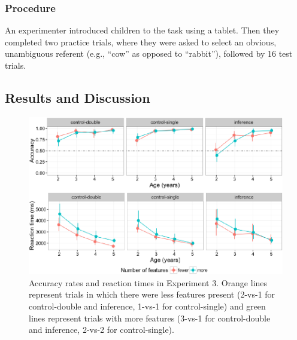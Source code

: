 \documentclass[a4paper,man,apacite,floatsintext]{apa6}
\newenvironment{CodeChunk}{}{}
\begin{document}
\subsubsection{Procedure}\label{procedure-1}

An experimenter introduced children to the task using a tablet. Then
they completed two practice trials, where they were asked to select an
obvious, unambiguous referent (e.g., ``cow'' as opposed to ``rabbit''),
followed by 16 test trials.

\subsection{Results and Discussion}\label{results-and-discussion-2}

\begin{CodeChunk}
\begin{figure}[H]

{\centering \includegraphics{figs/ipaccrt-1} 

}

\caption[Accuracy rates and reaction times in Experiment 3]{Accuracy rates and reaction times in Experiment 3. Orange lines represent trials in which there were less features present (2-vs-1 for control-double and inference, 1-vs-1 for control-single) and green lines represent trials with more features (3-vs-1 for control-double and inference, 2-vs-2 for control-single).}\label{fig:ipaccrt}
\end{figure}
\end{CodeChunk}
\end{document}
